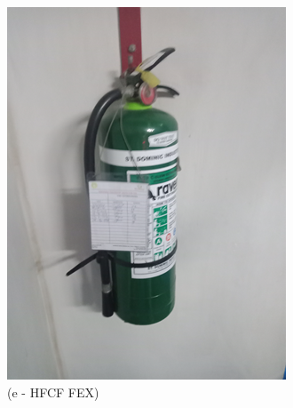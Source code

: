 \begin{figure}[!h]
\begin{minipage}[b]{0.22\linewidth}
		\includegraphics[width=\textwidth]{figures/ch04_fig_safety07}
		\caption*{(e - HFCF FEX)}
	\end{minipage}
	\hspace{0.03cm}
	\begin{minipage}[b]{0.22\linewidth}
		\centering

\end{minipage}
\end{figure}
